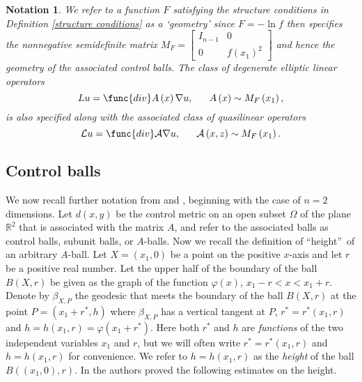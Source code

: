 \documentclass{amsart}
\theoremstyle{plain}
\newtheorem{notation}[theorem]{Notation}
\numberwithin{equation}{section}
\begin{document}
\begin{notation}
	We refer to a function $F$ satisfying the structure conditions in Definition %
	\ref{structure conditions} as a `geometry' since $F=-\ln f$ then specifies
	the nonnegative semidefinite matrix $M_{F}=\left[ 
	\begin{array}{cc}
	I_{n-1} & 0 \\ 
	0 & f\left( x_{1}\right) ^{2}%
	\end{array}%
	\right] $ and hence the geometry of the associated control balls. The class
	of degenerate elliptic linear operators%
	\begin{equation*}
	Lu=\func{div}A\left( x\right) \nabla u,\ \ \ \ \ A\left( x\right) \sim
	M_{F}\left( x_{1}\right) ,
	\end{equation*}%
	is also specified along with the associated class of quasilinear operators%
	\begin{equation*}
	\mathcal{L}u=\func{div}\mathcal{A}\nabla u,\ \ \ \ \ \mathcal{A}\left(
	x,z\right) \sim M_{F}\left( x_{1}\right) .
	\end{equation*}
\end{notation}

\subsection{Control balls}

We now recall further notation from \cite{KoRiSaSh1} and \cite{KoRiSaSh2},
beginning with the case of $n=2$ dimensions. Let $d\left( x,y\right) $ be
the control metric on an open subset $\Omega $ of the plane $\mathbb{R}^{2}$
that is associated with the matrix $A$, and refer to the associated balls as
control balls, subunit balls, or $A$-balls. Now we recall the definition of
\textquotedblleft height\textquotedblright\ of an arbitrary $A$-ball. Let $%
X=(x_{1},0)$ be a point on the positive $x$-axis and let $r$ be a positive
real number. Let the upper half of the boundary of the ball $B(X,r)$ be
given as the graph of the function $\varphi \left( x\right) $, $%
x_{1}-r<x<x_{1}+r$. Denote by $\beta _{X,P}$ the geodesic that meets the
boundary of the ball $B(X,r)$ at the point $P=(x_{1}+r^{\ast },h)$ where $%
\beta _{X,P}$ has a vertical tangent at $P$, $r^{\ast }=r^{\ast }\left(
x_{1},r\right) $ and $h=h\left( x_{1},r\right) =\varphi \left( x_{1}+r^{\ast
}\right) $. Here both $r^{\ast }$ and $h$ are \emph{functions} of the two
independent variables $x_{1}$ and $r$, but we will often write $r^{\ast
}=r^{\ast }\left( x_{1},r\right) $ and $h=h\left( x_{1},r\right) $ for
convenience. We refer to $h=h\left( x_{1},r\right) $ as the \emph{height} of
the ball $B((x_{1},0),r)$. In \cite{KoRiSaSh1} the authors proved the
following estimates on the height.
\end{document}
